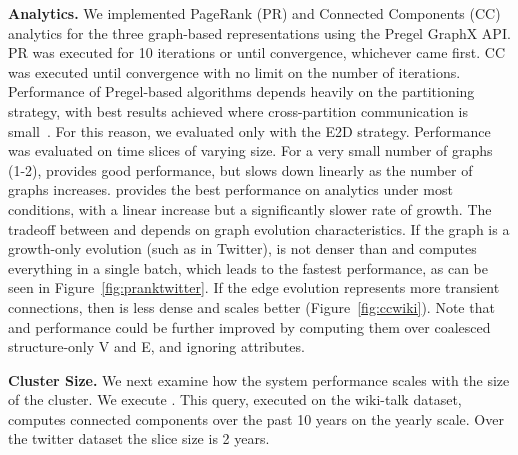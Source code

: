 {\bf Analytics.}  We implemented PageRank (PR) and Connected
Components (CC) analytics for the three graph-based representations
using the Pregel GraphX API.  PR was executed for 10 iterations or
until convergence, whichever came first. CC was executed until
convergence with no limit on the number of iterations.  Performance of
Pregel-based algorithms depends heavily on the partitioning strategy,
with best results achieved where cross-partition communication is
small~\cite{MoffittTempWeb16}.  For this reason, we evaluated only
with the E2D strategy.
%
Performance was evaluated on time slices of varying size.  For a very
small number of graphs (1-2), \sg provides good performance, but slows
down linearly as the number of graphs increases.  \hg provides the
best performance on analytics under most conditions, with a linear
increase but a significantly slower rate of growth.  The tradeoff
between \og and \hg depends on graph evolution characteristics.  If
the graph is a growth-only evolution (such as in Twitter), \og is not
denser than \hg and computes everything in a single batch, which leads
to the fastest performance, as can be seen in
Figure~\ref{fig:pranktwitter}.  If the edge evolution represents more
transient connections, then \hg is less dense and scales better
(Figure~\ref{fig:ccwiki}).  Note that \og and \hg performance could be
further improved by computing them over coalesced structure-only V and
E, and ignoring attributes.

{\bf Cluster Size.}  We next examine how the system performance scales
with the size of the cluster.  We execute
.
%
This query, executed on the wiki-talk dataset, computes connected
components over the past 10 years on the yearly scale.  Over the
twitter dataset the slice size is 2 years.


